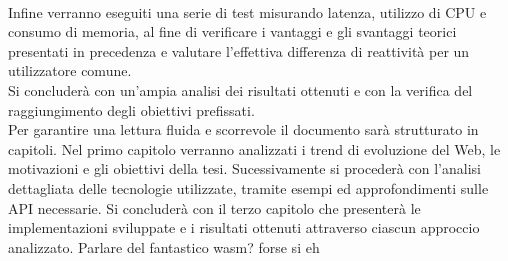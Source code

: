 \\Infine verranno eseguiti una serie di test misurando latenza, utilizzo di CPU e consumo di memoria, al fine di verificare i vantaggi e gli svantaggi teorici presentati in precedenza e valutare l'effettiva differenza di reattività per un utilizzatore comune.
\\Si concluderà con un'ampia analisi dei risultati ottenuti e con la verifica del raggiungimento degli obiettivi prefissati.
\\Per garantire una lettura fluida e scorrevole il documento sarà strutturato in capitoli. Nel primo capitolo verranno analizzati i trend di evoluzione del Web, le motivazioni e gli obiettivi della tesi.
Sucessivamente si procederà con l'analisi dettagliata delle tecnologie utilizzate, tramite esempi ed approfondimenti sulle API necessarie.
Si concluderà con il terzo capitolo che presenterà le implementazioni sviluppate e i risultati ottenuti attraverso ciascun approccio analizzato.
Parlare del fantastico wasm? forse si eh